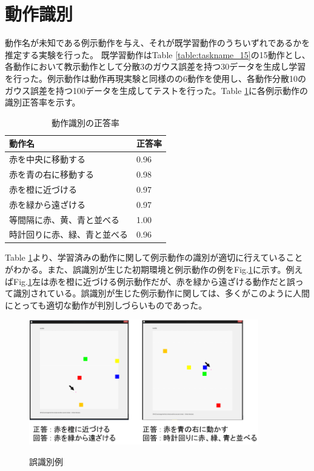 \section{動作識別}

動作名が未知である例示動作を与え、それが既学習動作のうちいずれであるかを推定する実験を行った。
既学習動作はTable \ref{table:taskname_15}の15動作とし、
各動作において教示動作として分散3のガウス誤差を持つ30データを生成し学習を行った。例示動作は動作再現実験と同様のの6動作を使用し、各動作分散10のガウス誤差を持つ100データを生成してテストを行った。Table \ref{table:result}に各例示動作の識別正答率を示す。
\begin{table}[h]
	\caption{動作識別の正答率}
	\label{table:result}
	\centering
  	\begin{tabular}{|l|l|} \hline
    	動作名 & 正答率\\ \hline
   	赤を中央に移動する 		& 0.96
    	\\
    	赤を青の右に移動する 		& 0.98
    	\\
    	赤を橙に近づける 			& 0.97
    	\\
    	赤を緑から遠ざける 			& 0.97
    	\\
    	等間隔に赤、黄、青と並べる 	& 1.00
    	\\
    	時計回りに赤、緑、青と並べる 	& 0.96
    	\\ \hline
  	\end{tabular}
\end{table}
Table \ref{table:result}より、学習済みの動作に関して例示動作の識別が適切に行えていることがわかる。また、誤識別が生じた初期環境と例示動作の例をFig.\ref{figure:failure}に示す。例えばFig.\ref{figure:failure}左は赤を橙に近づける例示動作だが、赤を緑から遠ざける動作だと誤って識別されている。誤識別が生じた例示動作に関しては、多くがこのように人間にとっても適切な動作が判別しづらいものであった。



	\begin{figure}[h]
		\begin{center}
			\includegraphics[width=10cm]{figure4.png} \\ %
			\caption{誤識別例}
			\label{figure:failure}
		\end{center}
	\end{figure}

